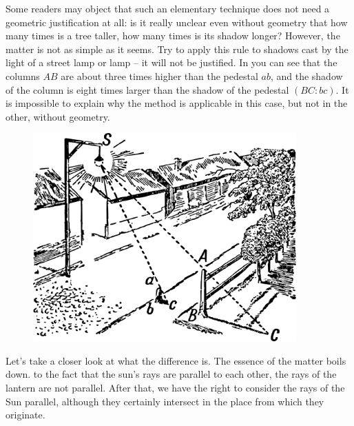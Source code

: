 Some readers may object that such an elementary technique does not need a geometric justification at all: is it really unclear even without geometry that how many times is a tree taller, how many times is its shadow longer? However, the matter is not as simple as it seems. Try to apply this rule to shadows cast by the light of a street lamp or lamp -- it will not be justified. In  you can see that the columns $AB$ are about three times higher than the pedestal $ab$, and the shadow of the column is eight times larger than the shadow of the pedestal $(BC:bc)$. It is impossible to explain why the method is applicable in this case, but not in the other, without geometry.

\begin{figure}[h!]
\centering
\includegraphics[width=0.9\textwidth]{figures/ch-01/fig-01-02.pdf}
\end{figure}


\ques Let's take a closer look at what the difference is. The essence of the matter boils down. to the fact that the sun's rays are parallel to each other, the rays of the lantern are not parallel. After that, we have the right to consider the rays of the Sun parallel, although they certainly intersect in the place from which they originate.


